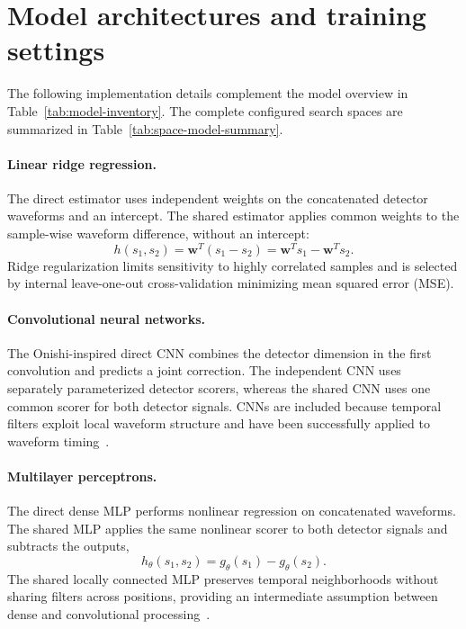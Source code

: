 \section{Model architectures and training settings}
\label{app:spaces}
The following implementation details complement the model overview in
Table~\ref{tab:model-inventory}. The complete configured search spaces are
summarized in Table~\ref{tab:space-model-summary}.

\paragraph{Linear ridge regression.}
The direct estimator uses independent weights on the concatenated detector
waveforms and an intercept. The shared estimator applies common weights to the
sample-wise waveform difference, without an intercept:
\begin{equation}
h(s_1,s_2)=\mathbf{w}^{T}(s_1-s_2)
=\mathbf{w}^{T}s_1-\mathbf{w}^{T}s_2.
\end{equation}
Ridge regularization limits sensitivity to highly correlated samples and is
selected by internal leave-one-out cross-validation minimizing mean squared
error (MSE).

\paragraph{Convolutional neural networks.}
The Onishi-inspired direct CNN combines the detector dimension in the first
convolution and predicts a joint correction. The independent CNN uses
separately parameterized detector scorers, whereas the shared CNN uses one
common scorer for both detector signals. CNNs are included because temporal
filters exploit local waveform structure and have been successfully applied
to waveform timing~\cite{onishi2022,loignon2025}.

\paragraph{Multilayer perceptrons.}
The direct dense MLP performs nonlinear regression on concatenated waveforms.
The shared MLP applies the same nonlinear scorer to both detector signals and
subtracts the outputs,
\begin{equation}
h_\theta(s_1,s_2)=g_\theta(s_1)-g_\theta(s_2).
\end{equation}
The shared locally connected MLP preserves temporal neighborhoods without
sharing filters across positions, providing an intermediate assumption
between dense and convolutional processing~\cite{elsayed2020}.

